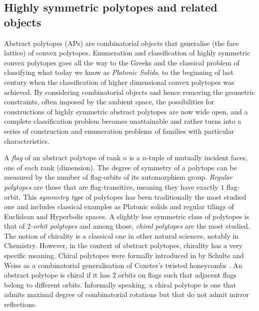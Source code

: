 \subsection*{Highly symmetric polytopes and related objects}

Abstract polytopes (APs) are combinatorial objects that generalise (the face lattice) of convex polytopes.
Enumeration and classification of highly symmetric convex polytopes goes all the way to the Greeks and the classical problem of classifying what today we know as \emph{Platonic Solids}, to the beginning of last century when the classification of higher dimensional convex polytopes was achieved.
By considering combinatorial objects and hence removing the geometric constraints, often imposed by the ambient space, the possibilities for constructions of highly symmetric abstract polytopes are now wide open, and a complete classification problem becomes unattainable and rather turns into a series of construction and enumeration problems of families with particular characteristics.

A \emph{flag} of an abstract polytope of rank $n$ is a $n$-tuple of mutually incident faces, one of each rank (dimension). 
The degree of symmetry of a polytope can be measured by the number of flag-orbits of its automorphism group.
%
\emph{Regular polytopes} are those that are flag-transitive, meaning they have exactly $1$ flag-orbit.
This \emph{symmetry type} of polytopes has been traditionally the most studied one and includes classical examples as Platonic solids and regular tilings of Euclidean and Hyperbolic spaces.
A slightly less symmetric class of polytopes is that of \emph{$2$-orbit polytopes} and among those, \emph{chiral polytopes} are the most studied.
The notion of chirality is a classical one in other natural sciences, notably in Chemistry.
However, in the context of abstract polytopes, chirality has a very specific meaning. 
Chiral polytopes were formally introduced in \cite*{SchulWeiss1991_ChiralPolytopes} by Schulte and Weiss as a combinatorial generalisation of Coxeter's twisted honeycombs \cite*{Coxeter1970_TwistedHoneycombs}.
An abstract polytope is chiral if it has $2$ orbits on flags such that adjacent flags belong to different orbits. 
Informally speaking, a chiral polytope is one that admits maximal degree of combinatorial rotations but that do not admit mirror reflections.

